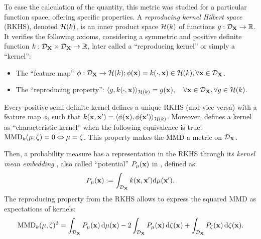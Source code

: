 To ease the calculation of the quantity, this metric was studied for a particular function space, offering specific properties.
A \emph{reproducing kernel Hilbert space} (RKHS), denoted $\mathcal{H}(k)$, is an inner product space $\mathcal{H}(k)$ of functions $g:\mathcal{D}_{{\bf X}} \rightarrow \mathbb{R}$.
It verifies the following axioms, considering a symmetric and positive definite function $k: \mathcal{D}_{{\bf X}} \times \mathcal{D}_{{\bf X}} \rightarrow \mathbb{R}$, later called a ``reproducing kernel'' or simply a ``kernel'': 
\begin{itemize}
    \item The ``feature map'' $\phi : \mathcal{D}_{{\bf X}} \to \mathcal{H}(k); \phi({\bf x}) = k(\cdot, {\bf x}) \in \mathcal{H}(k), \forall {\bf x} \in \mathcal{D}_{{\bf X}}$.
    \item The ``reproducing property'': $\langle g, k(\cdot, {\bf x}) \rangle_{\mathcal{H}(k)} = g({\bf x}), \quad \forall {\bf x} \in \mathcal{D}_{{\bf X}}, \forall g \in \mathcal{H}(k)$.
\end{itemize}
Every positive semi-definite kernel defines a unique RKHS (and vice versa) with a feature map $\phi$, such that $k({\bf x}, {\bf x}') = \langle \phi({\bf x}), \phi({\bf x}') \rangle_{\mathcal{H}(k)}$.
Moreover, \cite{sriperumbudur_2010} defines a kernel as ``characteristic kernel'' when the following equivalence is true: $\mathrm{MMD}_k(\mu, \zeta) = 0 \Leftrightarrow \mu = \zeta$. 
This property makes the MMD a metric on $\mathcal{D}_{{\bf X}}$.

Then, a probability measure has a representation in the RKHS through its \emph{kernel mean embedding} \citep{sejdinovic_2013}, also called ``potential'' $P_{\mu}({\bf x})$ in \cite{pronzato_zhigljavsky_2020}, defined as:
\begin{equation}
   P_{\mu}({\bf x}) := \int_{\mathcal{D}_{{\bf X}}} k({\bf x}, {\bf x}') \mathrm{d} \mu({\bf x}').
\end{equation}
The reproducing property from the RKHS allows to express the squared MMD as expectations of kernels:
\begin{equation}\label{eq:mmd2}
    \mathrm{MMD}_k(\mu, \zeta)^2 = \int_{\mathcal{D}_{{\bf X}}} P_{\mu}({\bf x})\, \mathrm{d}\mu({\bf x}) - 2 \int_{\mathcal{D}_{{\bf X}}} P_{\mu}({\bf x}) \, \mathrm{d}\zeta({\bf x}) + \int_{\mathcal{D}_{{\bf X}}} P_{\zeta}({\bf x})\, \mathrm{d}\zeta({\bf x}).
\end{equation}

